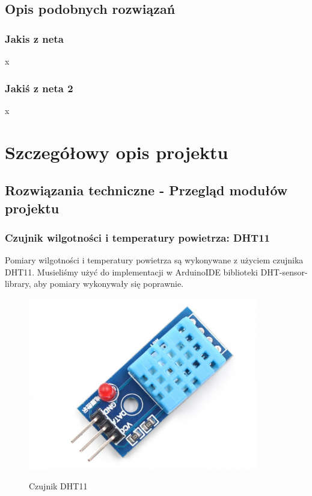 \documentclass[12pt]{article}
\begin{document}
\subsection{Opis podobnych rozwiązań }
\subsubsection{Jakis z neta}
x
\subsubsection{Jakiś z neta 2}
x


\section{Szczegółowy opis projektu}


\subsection{Rozwiązania techniczne - Przegląd modułów projektu}
\subsubsection{Czujnik wilgotności i temperatury powietrza: DHT11}
 Pomiary wilgotności i temperatury powietrza są wykonywane z użyciem czujnika DHT11. Musieliśmy użyć do implementacji w ArduinoIDE biblioteki DHT-sensor-library, aby pomiary wykonywały się poprawnie.
\begin{figure}[!h]
	\begin{center}
		{\includegraphics[width=10cm]{DHT11_photo.png}}
	\end{center}
	\caption{Czujnik DHT11}
\end{figure}
\end{document}
